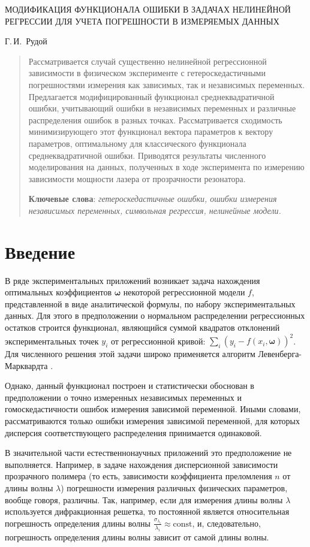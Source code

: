 \documentclass[tikz,11pt,a4paper]{article}
\begin{document}
\begin{center}
  МОДИФИКАЦИЯ ФУНКЦИОНАЛА ОШИБКИ В ЗАДАЧАХ НЕЛИНЕЙНОЙ РЕГРЕССИИ ДЛЯ УЧЕТА ПОГРЕШНОСТИ В ИЗМЕРЯЕМЫХ ДАННЫХ

  \bigskip
  Г.\,И.~Рудой
\end{center}

\begin{abstract}
  Рассматривается случай существенно нелинейной регрессионной зависимости
  в физическом эксперименте с гетероскедастичными погрешностями измерения
  как зависимых, так и независимых переменных.
  Предлагается модифицированный функционал среднеквадратичной ошибки,
  учитывающий ошибки в независимых переменных и различные распределения
  ошибок в разных точках. Рассматривается сходимость минимизирующего этот функционал
  вектора параметров к вектору параметров, оптимальному для классического
  функционала среднеквадратичной ошибки.
  Приводятся результаты численного моделирования на данных, полученных в ходе
  эксперимента по измерению зависимости мощности лазера от прозрачности
  резонатора.

  \textbf{Ключевые слова}: \emph{гетероскедастичные ошибки,
  ошибки измерения независимых переменных, символьная регрессия, нелинейные модели.}
\end{abstract}

\section{Введение}

В ряде экспериментальных приложений возникает задача нахождения оптимальных
коэффициентов $\boldsymbol{\omega}$ некоторой регрессионной модели $f$, представленной в
виде аналитической формулы, по набору экспериментальных данных. Для этого
в предположении о нормальном распределении регрессионных остатков
строится функционал, являющийся суммой квадратов отклонений экспериментальных
точек $y_i$ от регрессионной кривой: $\sum_i (y_i - f(x_i, \boldsymbol{\omega}))^2$.
Для численного решения этой задачи широко применяется алгоритм Левенберга-Марквардта
\cite{Marquardt1963Algorithm}.

Однако, данный функционал построен и статистически обоснован в предположении
о точно измеренных независимых переменных и гомоскедастичности ошибок измерения
зависимой переменной. Иными словами, рассматриваются только ошибки измерения
зависимой переменной, для которых дисперсия соответствующего распределения
принимается одинаковой.

В значительной части естественнонаучных приложений это предположение не
выполняется. Например, в задаче нахождения дисперсионной зависимости прозрачного
полимера (то есть, зависимости коэффициента преломления $n$ от длины волны
$\lambda$) \cite{Rudoy15MonteCarlo} погрешности измерения
различных физических параметров, вообще говоря, различны. Так, например, если
для измерения длины волны $\lambda$ используется дифракционная решетка, то постоянной
является относительная погрешность определения длины волны
$\frac{\sigma_{\lambda_i}}{\lambda_i} \approx \text{const}$, и, следовательно,
погрешность определения длины волны зависит от самой длины волны.
\end{document}

